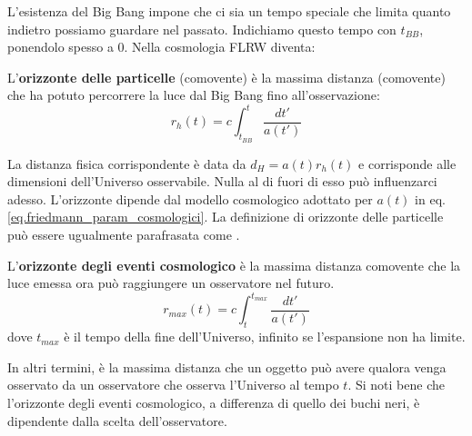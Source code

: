 L'esistenza del Big Bang impone che ci sia un tempo speciale che limita quanto indietro possiamo guardare nel passato. Indichiamo questo tempo con $t_{BB}$, ponendolo spesso a $0$. Nella cosmologia FLRW diventa:
\begin{definizione}
    L'\textbf{orizzonte delle particelle} (comovente) è la massima distanza (comovente) che ha potuto percorrere la luce dal Big Bang fino all'osservazione:
\begin{equation}
        r_{h}(t) = c\int_{t_{BB}}^t \frac{dt'}{a(t')}
        \label{eq.orizzonte_cosmologico_comovente}
\end{equation}
\end{definizione}
La distanza fisica corrispondente è data da $d_H = a(t)r_{h}(t)$ e corrisponde alle dimensioni dell'Universo osservabile. Nulla al di fuori di esso può influenzarci adesso. L'orizzonte dipende dal modello cosmologico adottato per $a(t)$ in eq. \ref{eq.friedmann_param_cosmologici}.  La definizione di orizzonte delle particelle può essere ugualmente parafrasata come .

\begin{definizione}
    L'\textbf{orizzonte degli eventi cosmologico} è la massima distanza comovente che la luce emessa ora può raggiungere un osservatore nel futuro.
    \begin{equation}
        r_{max}(t) = c \int_{t}^{t_{max}} \frac{dt'}{a(t')}
        \label{eq.event_horizon_comovente_cosmologia}
    \end{equation}
    dove $t_{max}$ è il tempo della fine dell'Universo, infinito se l'espansione non ha limite.
\end{definizione}
In altri termini, è la massima distanza che un oggetto può avere qualora venga osservato da un osservatore che osserva l'Universo al tempo $t$.
Si noti bene che l'orizzonte degli eventi cosmologico, a differenza di quello dei buchi neri, è dipendente dalla scelta dell'osservatore. 

